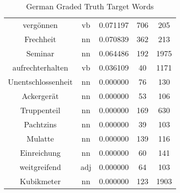 \begin{table}
\begin{tabular}{ccccc}
vergönnen          & vb            & 0.071197           & 706                & 205                 \\
Frechheit          & nn            & 0.070839           & 362                & 213                 \\
Seminar            & nn            & 0.064486           & 192                & 1975                \\
aufrechterhalten   & vb            & 0.036109           & 40                 & 1171                \\
Unentschlossenheit & nn            & 0.000000           & 76                 & 130                 \\
Ackergerät         & nn            & 0.000000           & 53                 & 106                 \\
Truppenteil        & nn            & 0.000000           & 169                & 630                 \\
Pachtzins          & nn            & 0.000000           & 39                 & 103                 \\
Mulatte            & nn            & 0.000000           & 139                & 116                 \\
Einreichung        & nn            & 0.000000           & 60                 & 141                 \\
weitgreifend       & adj           & 0.000000           & 64                 & 103                 \\
Kubikmeter         & nn            & 0.000000           & 123                & 1903                \\
\bottomrule
\end{tabular}
\caption{German Graded Truth Target Words}
\label{tab:deu-truthtargets}
\end{table}




